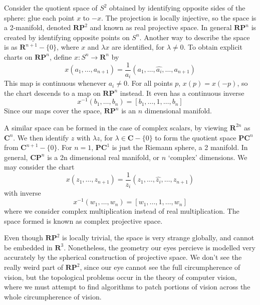 \begin{example}
    Consider the quotient space of $S^2$ obtained by identifying opposite sides of the sphere: glue each point $x$ to $-x$. The projection is locally injective, so the space is a 2-manifold, denoted  $\mathbf{R} \mathbf{P}^2$ and known as real projective space. In general $\mathbf{R} \mathbf{P}^n$ is created by identifying opposite points on $S^n$. Another way to describe the space is as $\mathbf{R}^{n+1} - \{ 0 \}$, where $x$ and $\lambda x$ are identified, for $\lambda \neq 0$. To obtain explicit charts on $\mathbf{R} \mathbf{P}^n$, define $x: S^n \to \mathbf{R}^n$ by
    \[ x(a_1, \dots, a_{n+1}) = \frac{1}{a_i} (a_1, \dots, \widehat{a_i}, \dots, a_{n+1}) \]
    This map is continuous whenever $a_i \neq 0$. For all points $p$, $x(p) = x(-p)$, so the chart descends to a map on $\mathbf{R} \mathbf{P}^n$ instead. It even has a continuous inverse
    \[ x^{-1}(b_1, \dots, b_n) = \left[ b_1, \dots, 1, \dots, b_n \right] \]
    Since our maps cover the space, $\mathbf{R} \mathbf{P}^n$ is an $n$ dimensional manifold.
\end{example}

\begin{example}
    A similar space can be formed in the case of complex scalars, by viewing $\mathbf{R}^{2n}$ as $\mathbf{C}^n$. We then identify $z$ with $\lambda z$, for $\lambda \in \mathbf{C} - \{ 0 \}$ to form the quotient space $\mathbf{P} \mathbf{C}^n$ from $\mathbf{C}^{n+1} - \{ 0 \}$. For $n = 1$, $\mathbf{P} \mathbf{C}^1$ is just the Riemann sphere, a 2 manifold. In general, $\mathbf{C} \mathbf{P}^n$ is a 2n dimensional real manifold, or $n$ `complex' dimensions. We may consider the chart
    \[ x(z_1, \dots, z_{n+1}) = \frac{1}{z_i} (z_1, \dots, \widehat{z_i}, \dots, z_{n+1}) \]
    with inverse
    \[ x^{-1}(w_1, \dots, w_n) = [w_1, \dots, 1, \dots, w_n] \]
    where we consider complex multiplication instead of real multiplication. The space formed is known as complex projective space.
\end{example}

Even though $\mathbf{R} \mathbf{P}^2$ is locally trivial, the space is very strange globally, and cannot be embedded in $\mathbf{R}^3$. Nonetheless, the geometry our eyes percieve is modelled very accurately by the spherical construction of projective space. We don't see the really weird part of $\mathbf{R} \mathbf{P}^2$, since our eye cannot see the full circumpherence of vision, but the topological problems occur in the theory of computer vision, where we must attempt to find algorithms to patch portions of vision across the whole circumpherence of vision.

